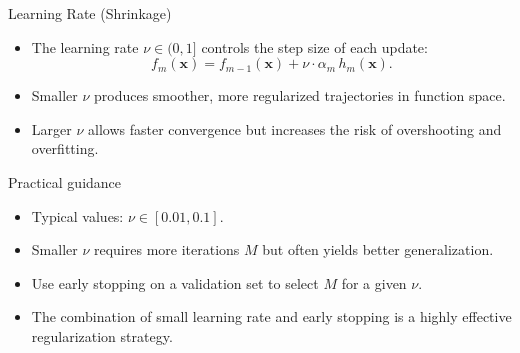 \begin{frame}{Learning Rate (Shrinkage)}
  \begin{itemize}
    \item The \alert{learning rate} $\nu \in (0, 1]$ controls the step size of each update:
          \[
          f_m(\mathbf{x}) = f_{m-1}(\mathbf{x}) + \nu \cdot \alpha_m\, h_m(\mathbf{x}).
          \]
    \item Smaller $\nu$ produces smoother, more regularized trajectories in function space.
    \item Larger $\nu$ allows faster convergence but increases the risk of overshooting and
          overfitting.
  \end{itemize}
  \begin{block}{Practical guidance}
    \begin{itemize}
      \item Typical values: $\nu \in [0.01, 0.1]$.
      \item Smaller $\nu$ requires more iterations $M$ but often yields better generalization.
      \item Use early stopping on a validation set to select $M$ for a given $\nu$.
    \end{itemize}
  \end{block}
  \begin{itemize}
    \item The combination of small learning rate and early stopping is a \alert{highly effective
          regularization strategy}.
  \end{itemize}
\end{frame}

